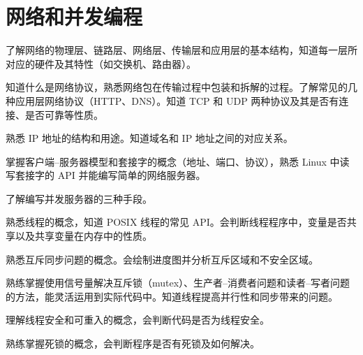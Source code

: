 \chapter{网络和并发编程}\thispagestyle{empty}
    \begin{summary}
        \begin{compactitem}
            \item 了解网络的物理层、链路层、网络层、传输层和应用层的基本结构，知道每一层所对应的硬件及其特性（如交换机、路由器）。
            \item 知道什么是网络协议，熟悉网络包在传输过程中包装和拆解的过程。了解常见的几种应用层网络协议（HTTP、DNS）。知道 TCP 和 UDP 两种协议及其是否有连接、是否可靠等性质。
            \item 熟悉 IP 地址的结构和用途。知道域名和 IP 地址之间的对应关系。
            \item 掌握客户端{--}服务器模型和套接字的概念（地址、端口、协议），熟悉 Linux 中读写套接字的 API 并能编写简单的网络服务器。
            \item 了解编写并发服务器的三种手段。
            \item 熟悉线程的概念，知道 POSIX 线程的常见 API。会判断线程程序中，变量是否共享以及共享变量在内存中的性质。
            \item 熟悉互斥同步问题的概念。会绘制进度图并分析互斥区域和不安全区域。
            \item 熟练掌握使用信号量解决互斥锁（mutex）、生产者{--}消费者问题和读者{--}写者问题的方法，能灵活运用到实际代码中。知道线程提高并行性和同步带来的问题。
            \item 理解线程安全和可重入的概念，会判断代码是否为线程安全。
            \item 熟练掌握死锁的概念，会判断程序是否有死锁及如何解决。
        \end{compactitem}
    \end{summary}

